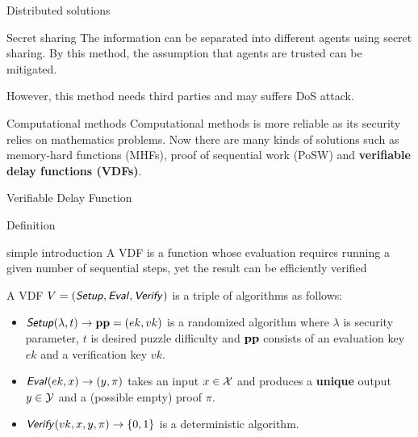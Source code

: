 \documentclass[UTF8]{beamer}
\begin{document}
	\begin{frame}{Distributed solutions}
		\begin{block}{Secret sharing}
			The information can be separated into different agents using secret sharing. By this method, the assumption that agents are trusted can be mitigated.
			
			However, this method needs third parties and may suffers DoS attack.
		\end{block}
		\begin{block}{Computational methods}
			Computational methods is more reliable as its security relies on mathematics problems. Now there are many kinds of solutions such as memory-hard functions (MHFs), proof of sequential work (PoSW) and \textbf{verifiable delay functions (VDFs)}.
		\end{block}
	\end{frame}

	\begin{frame}
		\centering
		\huge Verifiable Delay Function
	\end{frame}

	\begin{frame}{Definition}
        \begin{block}{simple introduction}
            A VDF is a function whose evaluation requires running a given number of sequential steps, yet the result can be efficiently verified
        \end{block}
		\begin{block}{}
			A VDF $V=(\textsf{\textit{Setup}},\textsf{\textit{Eval}},\textsf{\textit{Verify}})$ is a triple of algorithms as follows:
			\begin{itemize}
				\item $\textsf{\textit{Setup}}(\lambda, t)\to\mathbf{pp}=(ek,vk)$ is a randomized algorithm where $\lambda$ is security parameter, $t$ is desired puzzle difficulty and $\mathbf{pp}$ consists of an evaluation key $ek$ and a verification key $vk$.
				\item $\textsf{\textit{Eval}}(ek,x)\to(y,\pi)$ takes an input $x\in\mathcal{X}$ and produces a \textbf{unique} output $y\in\mathcal{Y}$ and a (possible empty) proof $\pi$.
				\item $\textsf{\textit{Verify}}(vk,x,y,\pi)\to\{0,1\}$ is a deterministic algorithm.
			\end{itemize}
		\end{block}
	\end{frame}
\end{document}
